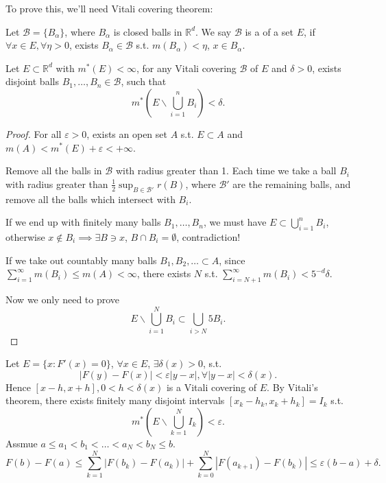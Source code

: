 To prove this, we'll need Vitali covering theorem:
\begin{definition}
	Let $\mathcal{B} = \{B_\alpha\}$, where $B_\alpha$ is closed balls in $\mathbb{R}^d$.
	We say $\mathcal{B}$ is a  of a set $E$,
	if  $\forall x\in E, \forall \eta > 0$, exists $B_\alpha\in \mathcal{B}$ s.t.
	$m(B_\alpha)<\eta$,  $x\in B_\alpha$.
\end{definition}

\begin{theorem}[Vitali]
    Let $E \subset \mathbb{R}^{d}$ with $m^*(E)<\infty$, for any Vitali covering
	$\mathcal{B}$ of $E$ and $\delta>0$,
	exists disjoint balls $B_1,\dots,B_n\in \mathcal{B}$,
	such that
	\[
	m^*\left(E\backslash \bigcup_{i=1}^n B_i\right) < \delta.
	\]
\end{theorem}

\begin{proof}[Proof]
    For all $\varepsilon > 0$, exists an open set $A$ s.t. $E \subset A$
	and $m(A)<m^*(E) + \varepsilon < + \infty$.

	Remove all the balls in $\mathcal{B}$ with radius greater than 1.
	Each time we take a ball $B_i$ with radius greater
	than $\frac{1}{2}\sup_{B\in \mathcal{B}'} r(B)$, where $\mathcal{B}'$ are
	the remaining balls, and remove all the balls which intersect with $B_i$.

	If we end up with finitely many balls  $B_1,\dots,B_n$, we must
	have $E \subset \bigcup_{i=1}^n B_i$, otherwise $x\notin B_i\implies \exists B\ni x$,
	$B\cap B_i = \emptyset$, contradiction!

	If we take out countably many balls $B_1,B_2,\dots \subset A$,
	since $ \sum_{i=1}^{\infty} m(B_i) \le m(A) <\infty$,
	there exists $N$ s.t. $ \sum_{i=N+1}^{\infty} m(B_i) < 5^{-d}\delta$.

	Now we only need to prove
	\[
		E\backslash \bigcup_{i=1}^N B_i \subset \bigcup_{i>N}5B_i.
	\]
\end{proof}

Let $E = \{x: F'(x) = 0\}$, $\forall x\in E$, $\exists \delta(x)>0$, s.t.
\[
|F(y) - F(x)| < \varepsilon |y - x|, \forall |y-x| < \delta(x).
\]
Hence $[x-h, x+h], 0<h<\delta(x)$ is a Vitali covering of $E$.
By Vitali's theorem, there exists finitely many disjoint intervals $[x_k-h_k,x_k+h_k]=I_k$ s.t.
\[
m^*(E\backslash\bigcup_{k=1}^N I_k) < \varepsilon.
\]
Assmue $a\le a_1<b_1<\dots<a_N<b_N\le b$.
\[
F(b) - F(a) \le \sum_{k=1}^{N} |F(b_k)-F(a_k)| + \sum_{k=0}^{N}|F(a_{k+1})-F(b_k)|
\le \varepsilon(b-a) + \delta.
\]

